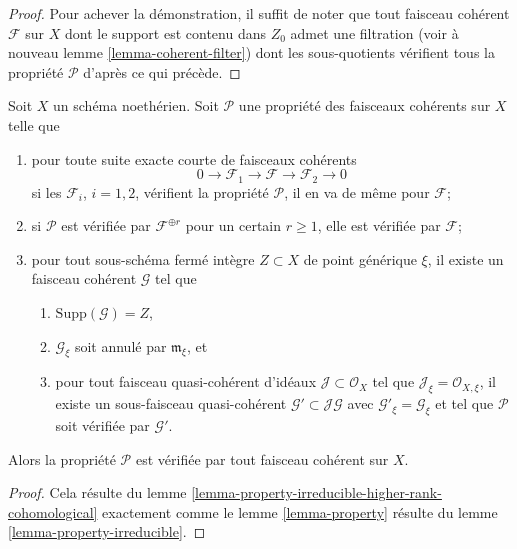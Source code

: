 \begin{proof}
\medskip\noindent
Pour achever la démonstration, il suffit de noter que tout faisceau cohérent
$\mathcal{F}$ sur $X$ dont le support est contenu dans $Z_0$ admet une filtration (voir
à nouveau lemme \ref{lemma-coherent-filter}) dont les sous-quotients
vérifient tous la propriété $\mathcal{P}$ d'après ce qui précède.
\end{proof}

\begin{lemma}
\label{lemma-property-higher-rank-cohomological}
Soit $X$ un schéma noethérien.
Soit $\mathcal{P}$ une propriété des faisceaux cohérents sur $X$ telle que
\begin{enumerate}
\item pour toute suite exacte courte de faisceaux cohérents
$$
0 \to \mathcal{F}_1 \to \mathcal{F} \to \mathcal{F}_2 \to 0
$$
si les $\mathcal{F}_i$, $i = 1, 2$, vérifient la propriété $\mathcal{P}$,
il en va de même pour $\mathcal{F}$;
\item si $\mathcal{P}$ est vérifiée par $\mathcal{F}^{\oplus r}$ pour un
certain $r \geq 1$, elle est vérifiée par $\mathcal{F}$;
\item pour tout sous-schéma fermé intègre $Z \subset X$
de point générique $\xi$, il
existe un faisceau cohérent $\mathcal{G}$ tel que
\begin{enumerate}
\item $\text{Supp}(\mathcal{G}) = Z$,
\item $\mathcal{G}_\xi$ soit annulé par $\mathfrak m_\xi$, et
\item pour tout faisceau quasi-cohérent d'idéaux
$\mathcal{J} \subset \mathcal{O}_X$ tel que
$\mathcal{J}_\xi = \mathcal{O}_{X, \xi}$, il existe un sous-faisceau
quasi-cohérent $\mathcal{G}' \subset \mathcal{J}\mathcal{G}$ avec
$\mathcal{G}'_\xi = \mathcal{G}_\xi$ et tel que
$\mathcal{P}$ soit vérifiée par $\mathcal{G}'$.
\end{enumerate}
\end{enumerate}
Alors la propriété $\mathcal{P}$ est vérifiée par tout faisceau cohérent
sur $X$.
\end{lemma}

\begin{proof}
Cela résulte du lemme \ref{lemma-property-irreducible-higher-rank-cohomological}
exactement comme le lemme \ref{lemma-property} résulte du
lemme \ref{lemma-property-irreducible}.
\end{proof}









